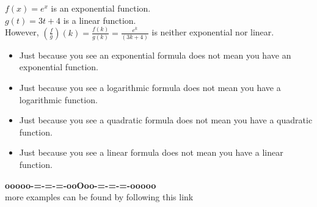 \documentclass{ximera}
\begin{document}
\begin{example}

$f(x) = e^x$ is an exponential function. \\
$g(t) = 3 t + 4$ is a linear function. \\

However, $\left(\frac{f}{g}\right)(k) = \frac{f(k)}{g(k)} = \frac{e^k}{(3 k + 4)}$ is neither exponential nor linear.

\end{example}











\begin{warning}


\begin{itemize}
\item Just because you see an exponential formula does not mean you have an exponential function. \\ 
\item Just because you see a logarithmic formula does not mean you have a logarithmic function. \\ 
\item Just because you see a quadratic formula does not mean you have a quadratic function. \\ 
\item Just because you see a linear formula does not mean you have a linear function. \\ 
\end{itemize}

\end{warning}












\begin{center}
\textbf{\textcolor{green!50!black}{ooooo-=-=-=-ooOoo-=-=-=-ooooo}} \\

more examples can be found by following this link\\ 

\end{center}
\end{document}
